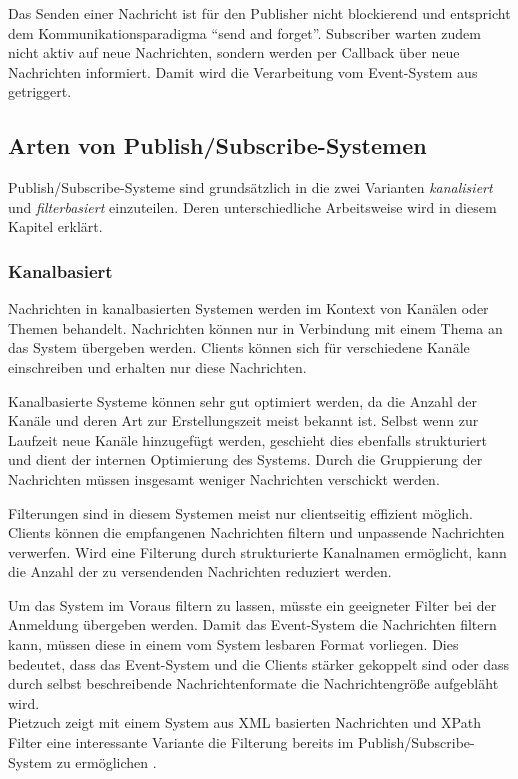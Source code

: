 Das Senden einer Nachricht ist für den Publisher nicht blockierend und entspricht dem Kommunikationsparadigma ``send and forget''. Subscriber warten zudem nicht aktiv auf neue Nachrichten, sondern werden per Callback über neue Nachrichten informiert. Damit wird die Verarbeitung vom Event-System aus getriggert.


\subsection{Arten von Publish/Subscribe-Systemen}
Publish/Subscribe-Systeme sind grundsätzlich in die zwei Varianten  \emph{kanalisiert} und \emph{filterbasiert} einzuteilen. Deren unterschiedliche Arbeitsweise wird in diesem Kapitel erklärt.

\subsubsection{Kanalbasiert}
\label{chap:grundlagen:pubsub:kanalbasiert}
Nachrichten in kanalbasierten Systemen werden im Kontext von Kanälen oder Themen behandelt. Nachrichten können nur in Verbindung mit einem Thema an das System übergeben werden. Clients können sich für verschiedene Kanäle einschreiben und erhalten nur diese Nachrichten.

Kanalbasierte Systeme können sehr gut optimiert werden, da die Anzahl der Kanäle und deren Art zur Erstellungszeit meist bekannt ist. Selbst wenn zur Laufzeit neue Kanäle hinzugefügt werden, geschieht dies ebenfalls strukturiert und dient der internen Optimierung des Systems. Durch die Gruppierung der Nachrichten müssen insgesamt weniger Nachrichten verschickt werden.

Filterungen sind in diesem Systemen meist nur clientseitig effizient möglich. Clients können die empfangenen Nachrichten filtern und unpassende Nachrichten verwerfen. Wird eine Filterung durch strukturierte Kanalnamen ermöglicht, kann die Anzahl der zu versendenden Nachrichten reduziert werden.

Um das System im Voraus filtern zu lassen, müsste ein geeigneter Filter bei der Anmeldung übergeben werden. Damit das Event-System die Nachrichten filtern kann, müssen diese in einem vom System lesbaren Format vorliegen. Dies bedeutet, dass das Event-System und die Clients stärker gekoppelt sind oder dass durch selbst beschreibende Nachrichtenformate die Nachrichtengröße aufgebläht wird.\\
Pietzuch zeigt mit einem System aus XML basierten Nachrichten und XPath Filter eine interessante Variante die Filterung bereits im Publish/Subscribe-System zu ermöglichen \cite{PiEyKoSh2007-PubSubAPI}.

